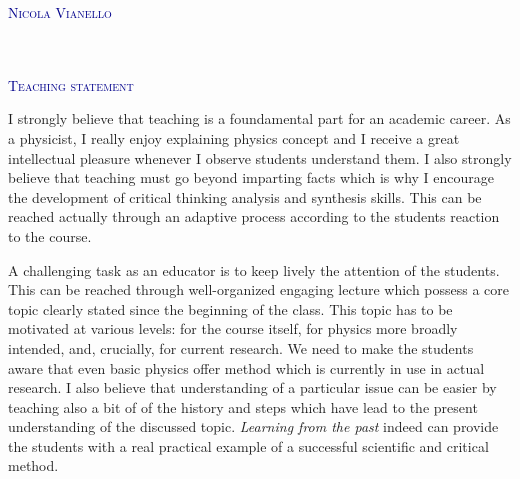 \documentclass[12pt,a4paper]{article}
\begin{document}
\begin{flushright}
\textcolor{darkBlue}{ \Huge
\lettrine[lines=3,findent=-1pt, loversize = -0.42,
lraise=0.6]{N}{icola Vianello}}\\[2pt]
\textcolor{Gray}{}\\
\textcolor{Gray}{}\\
\textcolor{Gray}{}
\end{flushright}
\begin{flushleft} 
\textcolor{darkBlue}{ \Huge
\lettrine[lines=2,findent=-1pt, loversize = -0.42,
lraise=0.6]{T}{eaching statement}} 
\end{flushleft}
I strongly believe that teaching is a foundamental part for an
academic career. As a physicist, I really enjoy explaining physics
concept and I receive a great intellectual pleasure whenever I observe
students understand them. I also strongly believe that teaching must
go beyond imparting facts which is why I encourage the development of
critical thinking analysis and synthesis skills. This can be reached
actually through an adaptive process according to the students
reaction to the course. 

A challenging task as an educator is to keep lively the attention of
the students. This can be reached through well-organized engaging
lecture which possess a core topic clearly stated since the beginning
of the class. This topic has to be motivated at various levels: 
for the course itself, for physics more broadly intended, and, crucially, for current research.
We need to make the students aware
 that even basic physics offer method which is currently in use in
 actual research. I also believe that understanding of a particular
issue can be easier by teaching also a bit of 
of the history and steps which have lead to the present understanding
of the discussed topic. \emph{Learning from the past} indeed can provide the
students with a real practical example of a successful scientific
and critical method. 
\end{document}
